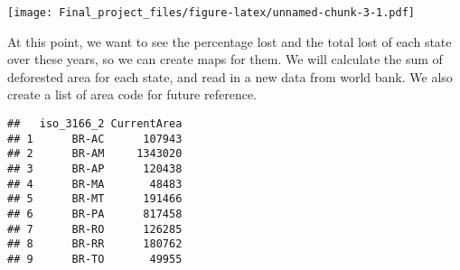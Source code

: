 \documentclass[
]{article}
\newenvironment{Shaded}{\begin{snugshade}}{\end{snugshade}}
\newcommand{\AttributeTok}[1]{\textcolor[rgb]{0.13,0.29,0.53}{#1}}
\newcommand{\FunctionTok}[1]{\textcolor[rgb]{0.13,0.29,0.53}{\textbf{#1}}}
\newcommand{\NormalTok}[1]{#1}
\newcommand{\OtherTok}[1]{\textcolor[rgb]{0.56,0.35,0.01}{#1}}
\newcommand{\SpecialCharTok}[1]{\textcolor[rgb]{0.81,0.36,0.00}{\textbf{#1}}}
\newcommand{\StringTok}[1]{\textcolor[rgb]{0.31,0.60,0.02}{#1}}
\begin{document}
\texttt{[image: Final\_project\_files/figure-latex/unnamed-chunk-3-1.pdf]}

At this point, we want to see the percentage lost and the total lost of
each state over these years, so we can create maps for them. We will
calculate the sum of deforested area for each state, and read in a new
data from world bank. We also create a list of area code for future
reference.

\begin{Shaded}
\end{Shaded}

\begin{verbatim}
##   iso_3166_2 CurrentArea
## 1      BR-AC      107943
## 2      BR-AM     1343020
## 3      BR-AP      120438
## 4      BR-MA       48483
## 5      BR-MT      191466
## 6      BR-PA      817458
## 7      BR-RO      126285
## 8      BR-RR      180762
## 9      BR-TO       49955
\end{verbatim}
\end{document}
